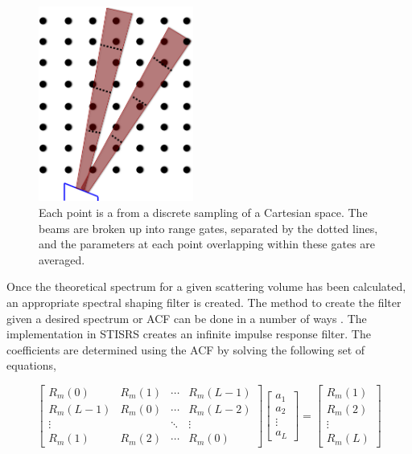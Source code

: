 \documentclass[draft,ras]{agutex}
\begin{document}
\begin{article}
\begin{figure}[!t]
\centering
\includegraphics[width=2in]{beamsampling}
\caption{Each point is a from a discrete sampling of a Cartesian space. The beams are broken up into range gates, separated by the dotted lines, and the parameters at each point overlapping within these gates are averaged.}
\label{fig:beamdia}
\end{figure}
 


Once the theoretical spectrum for a given scattering volume has been calculated, an appropriate spectral shaping filter is created. The method to create the filter given a desired spectrum or ACF can be done in a number of ways \citep{Kasdin:1995wi}. The implementation in STISRS creates an infinite impulse response filter. The coefficients are determined using the ACF by solving the following set of equations,

\begin{equation}
\label{eq:filtereq}
\begin{bmatrix} R_m(0) & R_m(1)& \cdots & R_m(L-1) \\ R_m(L-1) & R_m(0)& \cdots & R_m(L-2)\\ \vdots & &\ddots  & \vdots \\  R_m(1) & R_m(2) & \cdots & R_m(0) \end{bmatrix} \left[ \begin{array}{c} a_1\\ a_2\\\vdots \\ a_L \end{array} \right]=\left[ \begin{array}{c} R_m(1) \\ R_m(2)\\ \vdots \\R_m(L) \end{array} \right]
\end{equation}


\end{article}
\end{document}
